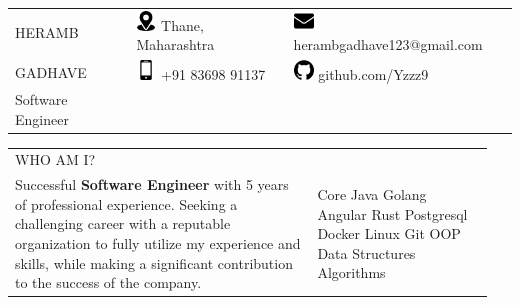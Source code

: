 \documentclass{letter}
\begin{document}
\sffamily
\begin{tabular}{l@{\hspace{75pt}}ll} 
  \Huge\colorbox{black!100}{\textcolor{white!90}{HERAMB}} 
    & \includegraphics[height=15pt]{images/location.png} Thane, Maharashtra 
    & \includegraphics[height=15pt]{images/email.png} herambgadhave123@gmail.com \\
  \Huge\colorbox{black!100}{\textcolor{white!90}{GADHAVE}}
    & \includegraphics[height=15pt]{images/cell-phone.png} +91 83698 91137 
    & \includegraphics[height=15pt]{images/github.png} github.com/Yzzz9 \\[1ex]
  \Large Software Engineer & \\
\end{tabular}

\vspace{15pt}
\begin{tabular}{p{0.6\linewidth} p{0.35\linewidth}}
  \normalsize\colorbox{black!100}{\textcolor{white!90}{WHO AM I?}} \\[1ex]  
  \raggedright{Successful \textbf{Software Engineer} with 5 years of professional experience. Seeking a challenging career with a reputable organization to fully utilize my experience and skills, 
  while making a significant contribution to the success of the company.}
    & 
    \raggedright{
      \colorbox{black!100}{\textcolor{white!90}{Core Java}} 
      \colorbox{black!100}{\textcolor{white!90}{Golang}} 
      \colorbox{black!100}{\textcolor{white!90}{Angular}}
      \colorbox{black!100}{\textcolor{white!90}{Rust}}
      \colorbox{black!100}{\textcolor{white!90}{Postgresql}}
      \colorbox{black!100}{\textcolor{white!90}{Docker}}
      \colorbox{black!100}{\textcolor{white!90}{Linux}}
      \colorbox{black!100}{\textcolor{white!90}{Git}}
      \colorbox{black!100}{\textcolor{white!90}{OOP}}
      \colorbox{black!100}{\textcolor{white!90}{Data Structures}}
      \colorbox{black!100}{\textcolor{white!90}{Algorithms}}
    }
    \\
\end{tabular}
\end{document}
